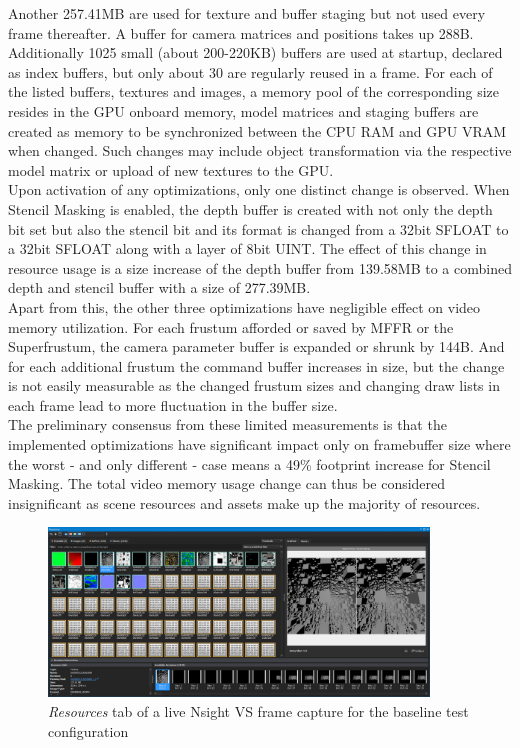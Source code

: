 Another 257.41MB are used for texture and buffer staging but not used every frame thereafter. A buffer for camera matrices and positions takes up 288B. Additionally 1025 small (about 200-220KB) buffers are used at startup, declared as index buffers, but only about 30 are regularly reused in a frame. For each of the listed buffers, textures and images, a  memory pool of the corresponding size resides in the GPU onboard memory, model matrices and staging buffers are created as  memory to be synchronized between the CPU RAM and GPU VRAM when changed. Such changes may include object transformation via the respective model matrix or upload of new textures to the GPU. \\

Upon activation of any optimizations, only one distinct change is observed. When Stencil Masking is enabled, the depth buffer is created with not only the depth bit set but also the stencil bit and its format is changed from a 32bit SFLOAT to a 32bit SFLOAT along with a layer of 8bit UINT. The effect of this change in resource usage is a size increase of the depth buffer from 139.58MB to a combined depth and stencil buffer with a size of 277.39MB. \\
Apart from this, the other three optimizations have negligible effect on video memory utilization. For each frustum afforded or saved by \gls{MFFR} or the Superfrustum, the camera parameter buffer is expanded or shrunk by 144B. And for each additional frustum the command buffer increases in size, but the change is not easily measurable as the changed frustum sizes and changing draw lists in each frame lead to more fluctuation in the buffer size. \\

The preliminary consensus from these limited measurements is that the implemented optimizations have significant impact only on framebuffer size where the worst - and only different - case means a 49\% footprint increase for Stencil Masking. The total video memory usage change can thus be considered insignificant as scene resources and assets make up the majority of resources. 

\begin{figure}[h!]
  \centering
  \includegraphics[width=0.9\textwidth]{pictures/nsight_vmem}
  \caption{\textit{Resources} tab of a live Nsight VS frame capture for the baseline test configuration} \label{fig:nsight_vmem}
\end{figure}